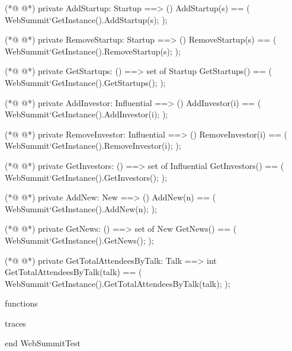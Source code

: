 \begin{vdmpp}[breaklines=true]
(*@
\label{AddStartup:531}
@*)
 private AddStartup: Startup ==> ()
 AddStartup(s) == (
  WebSummit`GetInstance().AddStartup(s);
 );
 
(*@
\label{RemoveStartup:536}
@*)
 private RemoveStartup: Startup ==> ()
 RemoveStartup(s) == (
  WebSummit`GetInstance().RemoveStartup(s);
 ); 
 
(*@
\label{GetStartups:541}
@*)
 private GetStartups: () ==> set of Startup
 GetStartups() == (
  WebSummit`GetInstance().GetStartups();
 ); 
 
(*@
\label{AddInvestor:546}
@*)
 private AddInvestor: Influential ==> ()
 AddInvestor(i) == (
  WebSummit`GetInstance().AddInvestor(i);
 );
 
(*@
\label{RemoveInvestor:551}
@*)
 private RemoveInvestor: Influential ==> ()
 RemoveInvestor(i) == (
  WebSummit`GetInstance().RemoveInvestor(i);
 );
 
(*@
\label{GetInvestors:556}
@*)
 private GetInvestors: () ==> set of Influential
 GetInvestors() == (
  WebSummit`GetInstance().GetInvestors();
 );
 
(*@
\label{AddNew:561}
@*)
 private AddNew: New ==> ()
 AddNew(n) == (
  WebSummit`GetInstance().AddNew(n);
 ); 
 
(*@
\label{GetNews:566}
@*)
 private GetNews: () ==> set of New
 GetNews() == (
  WebSummit`GetInstance().GetNews();
 );
 
(*@
\label{GetTotalAttendeesByTalk:571}
@*)
 private GetTotalAttendeesByTalk: Talk ==> int
 GetTotalAttendeesByTalk(talk) == (
  WebSummit`GetInstance().GetTotalAttendeesByTalk(talk);
 ); 
 
functions

traces

end WebSummitTest
\end{vdmpp}
